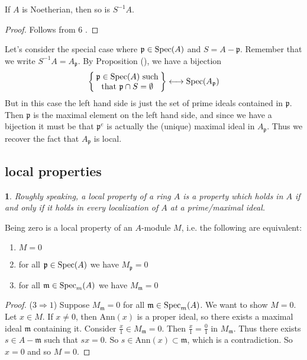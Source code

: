 \documentclass[12pt]{article}
\newtheorem{para}[theorem]{}
\begin{document}
\begin{corollary}
	If $A$ is Noetherian, then so is $S^{-1}A$.
\end{corollary}
\begin{proof}
	Follows from 6 .
\end{proof}

\begin{example}
	Let's consider the special case where $\mathfrak{p}\in\text{Spec}(A)$ and $S=A-\mathfrak{p}$. Remember that we write $S^{-1}A=A_\mathfrak{p}$. By Proposition (), we have a bijection
	\begin{equation*}
		\left\{\parbox{8em}{\centering{$\mathfrak{p}\in\Spec(A)$ such that $\mathfrak{p}\cap S=\emptyset$}}\right\} \longleftrightarrow \Spec(A_\mathfrak{p}) \\
	\end{equation*}
	But in this case the left hand side is just the set of prime ideals contained in $\mathfrak{p}$. Then $\mathfrak{p}$ is the maximal element on the left hand side, and since we have a bijection it must be that $\mathfrak{p}^e$ is actually the (unique) maximal ideal in $A_\mathfrak{p}$. Thus we recover the fact that $A_\mathfrak{p}$ is local.
\end{example}


\subsection{local properties} %

\begin{para}
	Roughly speaking, a local property of a ring $A$ is a property which holds in $A$ if and only if it holds in every localization of $A$ at a prime/maximal ideal.
\end{para}

\begin{proposition}
	Being zero is a local property of an $A$-module $M$, i.e. the following are equivalent:
	\begin{enumerate}
		\item $M=0$
		\item for all $\mathfrak{p}\in\text{Spec}(A)$ we have $M_\mathfrak{p}=0$
		\item for all $\mathfrak{m}\in\text{Spec}_m(A)$ we have $M_\mathfrak{m}=0$
	\end{enumerate}
\end{proposition}
\begin{proof}
	($3\Rightarrow 1$) Suppose $M_\mathfrak{m}=0$ for all $\mathfrak{m}\in\text{Spec}_m(A)$. We want to show $M=0$. Let $x\in M$. If $x\neq 0$, then $\text{Ann}(x)$ is a proper ideal, so there exists a maximal ideal $\mathfrak{m}$ containing it. Consider $\frac{x}{1}\in M_\mathfrak{m}=0$. Then $\frac{x}{1}=\frac{0}{1}$ in $M_\mathfrak{m}$. Thus there exists $s\in A-\mathfrak{m}$ such that $sx=0$. So $s\in\text{Ann}(x)\subset\mathfrak{m}$, which is a contradiction. So $x=0$ and so $M=0$.
\end{proof}
\end{document}

